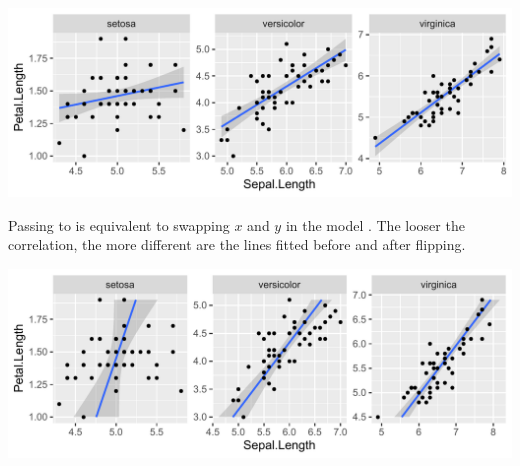 \documentclass[krantz2]{krantz}\usepackage{knitr}
\begin{document}
\begin{knitrout}\footnotesize
{}\color{fgcolor}\begin{kframe}
\begin{alltt}
 \hlopt{+} \hlstd{(} \hlstd{=} \hlstd{,}   \hlopt{~} 
\end{alltt}
\end{kframe}

{\centering \includegraphics[width=.99\textwidth]{figure/pos-flipping-05-ggplot-1} 

}


\end{knitrout}

Passing  to  is equivalent to swapping $x$ and $y$ in the model . The looser the correlation, the more different are the lines fitted before and after flipping.

\begin{knitrout}\footnotesize
{}\color{fgcolor}\begin{kframe}
\begin{alltt}
 \hlopt{+} \hlstd{(} \hlstd{=} \hlstd{,}   \hlopt{~}   \hlstd{=} \hlstd{)}
\end{alltt}
\end{kframe}

{\centering \includegraphics[width=.99\textwidth]{figure/pos-flipping-06-ggplot-1} 

}


\end{knitrout}
\end{document}
